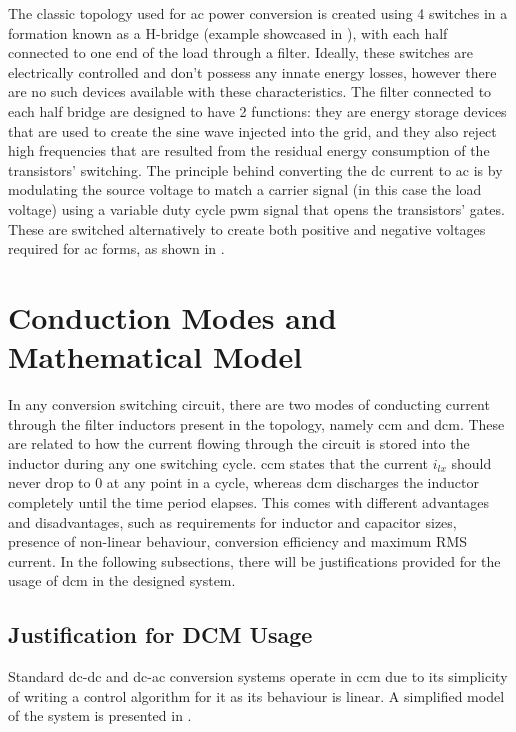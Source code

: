 The classic topology used for \gls{ac} power conversion is created using 4 switches in a formation known as a \gls{H-bridge} (example showcased in ), with each half connected to one end of the load through a filter. \cite{rashid2013power}
Ideally, these switches are electrically controlled and don't possess any innate energy losses, however there are no such devices available with these characteristics.
The filter connected to each half bridge are designed to have 2 functions: they are energy storage devices that are used to create the sine wave injected into the grid, and they also reject high frequencies that are resulted from the residual energy consumption of the transistors' switching.
The principle behind converting the \gls{dc} current to \gls{ac} is by modulating the source voltage to match a carrier signal (in this case the load voltage) using a variable duty cycle \gls{pwm} signal that opens the transistors' gates.
These are switched alternatively to create both positive and negative voltages required for \gls{ac} forms, as shown in .

\section{Conduction Modes and Mathematical Model}
\label{sec:condmodes}

In any conversion switching circuit, there are two modes of conducting current through the filter inductors present in the topology, namely \gls{ccm} and \gls{dcm}.
These are related to how the current flowing through the circuit is stored into the inductor during any one switching cycle.
\gls{ccm} states that the current $i_{lx}$ should never drop to $0$ at any point in a cycle, whereas \gls{dcm} discharges the inductor completely until the time period elapses.
This comes with different advantages and disadvantages, such as requirements for inductor and capacitor sizes, presence of non-linear behaviour, conversion efficiency and maximum RMS current.
In the following subsections, there will be justifications provided for the usage of \gls{dcm} in the designed system.

\subsection{Justification for DCM Usage}
\label{subsec:justdcm}

Standard \gls{dc}-\gls{dc} and \gls{dc}-\gls{ac} conversion systems operate in \gls{ccm} due to its simplicity of writing a control algorithm for it as its behaviour is linear.
A simplified model of the system is presented in .


